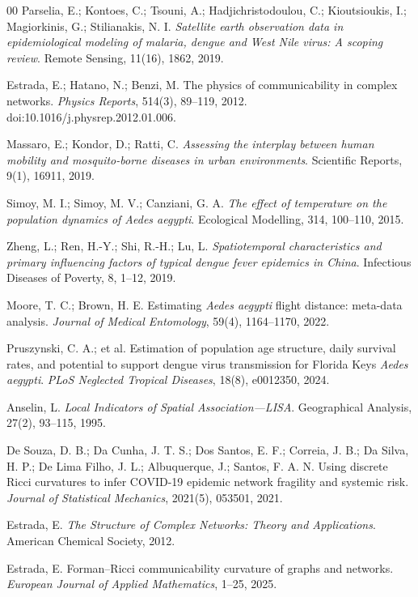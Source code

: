 \documentclass[final,3p,times,twocolumn]{elsarticle}
\begin{document}
\begin{thebibliography}{00}
Parselia, E.; Kontoes, C.; Tsouni, A.; Hadjichristodoulou, C.; Kioutsioukis, I.; 
Magiorkinis, G.; Stilianakis, N. I.
\textit{Satellite earth observation data in epidemiological modeling of malaria, dengue and West Nile virus: A scoping review}.
Remote Sensing, 11(16), 1862, 2019.

Estrada, E.; Hatano, N.; Benzi, M.
The physics of communicability in complex networks.
\textit{Physics Reports}, 514(3), 89--119, 2012.
doi:10.1016/j.physrep.2012.01.006.

Massaro, E.; Kondor, D.; Ratti, C.
\textit{Assessing the interplay between human mobility and mosquito-borne diseases in urban environments}.
Scientific Reports, 9(1), 16911, 2019.

Simoy, M. I.; Simoy, M. V.; Canziani, G. A.
\textit{The effect of temperature on the population dynamics of Aedes aegypti}.
Ecological Modelling, 314, 100--110, 2015.

Zheng, L.; Ren, H.-Y.; Shi, R.-H.; Lu, L.
\textit{Spatiotemporal characteristics and primary influencing factors of typical dengue fever epidemics in China}.
Infectious Diseases of Poverty, 8, 1--12, 2019.

Moore, T. C.; Brown, H. E.
Estimating \textit{Aedes aegypti} flight distance: meta-data analysis.
\textit{Journal of Medical Entomology}, 59(4), 1164--1170, 2022.

Pruszynski, C. A.; et al.
Estimation of population age structure, daily survival rates, and potential to support dengue virus transmission for Florida Keys \textit{Aedes aegypti}.
\textit{PLoS Neglected Tropical Diseases}, 18(8), e0012350, 2024.

Anselin, L.
\textit{Local Indicators of Spatial Association—LISA}.
Geographical Analysis, 27(2), 93--115, 1995.

De Souza, D. B.; Da Cunha, J. T. S.; Dos Santos, E. F.; Correia, J. B.; Da Silva, H. P.; De Lima Filho, J. L.; Albuquerque, J.; Santos, F. A. N.
Using discrete Ricci curvatures to infer COVID-19 epidemic network fragility and systemic risk.
\textit{Journal of Statistical Mechanics}, 2021(5), 053501, 2021.

Estrada, E.
\textit{The Structure of Complex Networks: Theory and Applications}.
American Chemical Society, 2012.

Estrada, E.
Forman--Ricci communicability curvature of graphs and networks.
\textit{European Journal of Applied Mathematics}, 1--25, 2025.


\end{thebibliography}
\end{document}
